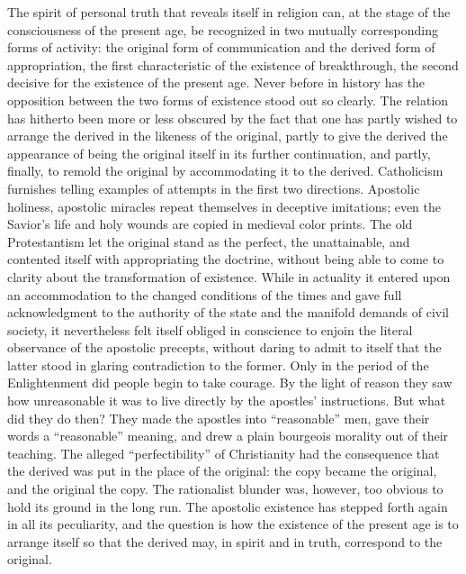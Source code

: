 \documentclass[12pt,a4paper,openany]{book}
\newcommand{\opage}[1]{\marginnote{\footnotesize\textit{[#1]}}}
\begin{document}
The spirit of personal truth that reveals itself in religion can, at the
stage of the consciousness of the present age, be recognized in two
mutually corresponding forms of activity: the original form of
communication and the derived form of appropriation, the first
characteristic of the existence of breakthrough, the second decisive for
the existence of the present age. Never before in history has the
opposition between the two forms of existence stood out so clearly. The
relation has hitherto been more or less obscured by the fact that one has
partly wished to arrange the derived in the likeness of the original,
partly to give the derived the appearance of being the original itself
in its further continuation, and partly, finally, to remold the original
by accommodating it to the derived. Catholicism furnishes telling
examples of attempts in the first two directions. Apostolic holiness,
apostolic miracles repeat themselves in deceptive imitations; even the
Savior's life and holy wounds are \opage{95}copied in medieval color prints. The
old Protestantism let the original stand as the perfect, the
unattainable, and contented itself with appropriating the doctrine,
without being able to come to clarity about the transformation of
existence. While in actuality it entered upon an accommodation to the
changed conditions of the times and gave full acknowledgment to the
authority of the state and the manifold demands of civil society, it
nevertheless felt itself obliged in conscience to enjoin the literal
observance of the apostolic precepts, without daring to admit to itself
that the latter stood in glaring contradiction to the former. Only in the
period of the Enlightenment did people begin to take courage. By the
light of reason they saw how unreasonable it was to live directly by the
apostles' instructions. But what did they do then? They made the apostles
into ``reasonable'' men, gave their words a ``reasonable'' meaning, and
drew a plain bourgeois morality out of their teaching. The alleged
``perfectibility'' of Christianity had the consequence that the derived
was put in the place of the original: the copy became the original, and
the original the copy. The rationalist blunder was, however, too obvious
to hold its ground in the long run. The apostolic existence has stepped
forth again in all its peculiarity, and the question is how the existence
of the present age is to arrange itself so that the derived may, in spirit
and in truth, correspond to the original.
\end{document}
